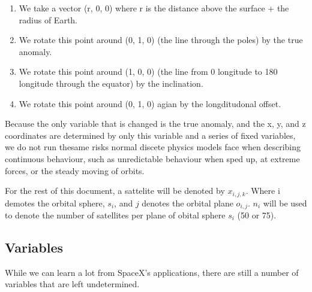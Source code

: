 \documentclass[12pt]{article}
\begin{document}
\begin{enumerate}
\item We take a vector (r, 0, 0) where r is the distance above the surface + the radius of Earth.
\item We rotate this point around (0, 1, 0) (the line through the poles) by the true anomaly.
\item We rotate this point around (1, 0, 0) (the line from 0 longitude to 180 longitude through the equator) by the inclination.
\item We rotate this point around (0, 1, 0) agian by the longditudonal offset.
\end{enumerate}

Because the only variable that is changed is the true anomaly, and the x, y, and z coordinates are determined by only this variable and a series of fixed variables, we do not run thesame risks normal discete physics models face when describing continuous behaviour, such as unredictable behaviour when sped up, at extreme forces, or the steady moving of orbits.

For the rest of this document, a sattelite will be denoted by $x_{i,j,k}$. Where i demotes the orbital sphere, $s_i$, and $j$ denotes the orbital plane $o_{i,j}$. $n_i$ will be used to denote the number of satellites per plane of obital sphere $s_i$ (50 or 75).

\subsection{Variables}
While we can learn a lot from SpaceX's applications, there are still a number of variables that are left undetermined. 
\end{document}
